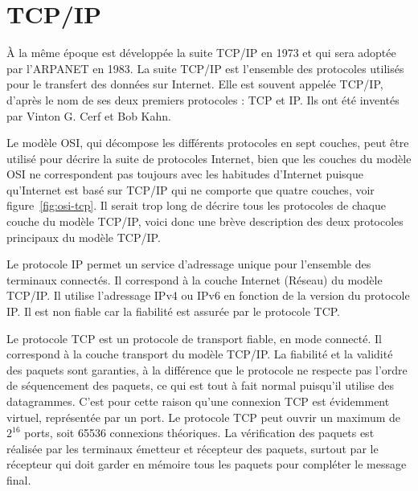 \documentclass[12pt]{report}
\begin{document}
\section{TCP/IP}

À la même époque est développée la suite TCP/IP en 1973 et qui sera adoptée par l'\gls{ARPANET} en 1983. La suite TCP/IP est l'ensemble des protocoles utilisés pour le transfert des données sur Internet. Elle est souvent appelée TCP/IP, d'après le nom de ses deux premiers protocoles : \gls{TCP} et \gls{IP}. Ils ont été inventés par Vinton G. Cerf et Bob Kahn.

Le modèle OSI, qui décompose les différents protocoles en sept couches, peut être utilisé pour décrire la suite de protocoles Internet, bien que les couches du modèle OSI ne correspondent pas toujours avec les habitudes d'Internet puisque qu'Internet est basé sur TCP/IP qui ne comporte que quatre couches, voir figure~\ref{fig:osi-tcp}. Il serait trop long de décrire tous les protocoles de chaque couche du modèle TCP/IP, voici donc une brève description des deux protocoles principaux du modèle TCP/IP\cite{wikitcpip}.

Le protocole IP permet un service d'adressage unique pour l'ensemble des terminaux connectés. Il correspond à la couche Internet (Réseau) du modèle TCP/IP. Il utilise l'adressage IPv4 ou IPv6 en fonction de la version du protocole IP. Il est \og non fiable \fg{} car la fiabilité est assurée par le protocole TCP\cite{wikiip}.

Le protocole TCP est un protocole de transport fiable, en mode connecté. Il correspond à la couche transport du modèle TCP/IP. La fiabilité et la validité des paquets sont garanties, à la différence que le protocole ne respecte pas l'ordre de séquencement des paquets, ce qui est tout à fait normal puisqu'il utilise des datagrammes. C'est pour cette raison qu'une connexion TCP est évidemment virtuel, représentée par un port. Le protocole TCP peut ouvrir un maximum de $2^{16}$ ports, soit 65536 connexions théoriques. La vérification des paquets est réalisée par les terminaux émetteur et récepteur des paquets, surtout par le récepteur qui doit garder en mémoire tous les paquets pour compléter le message final\cite{wikitcp}.
\end{document}

